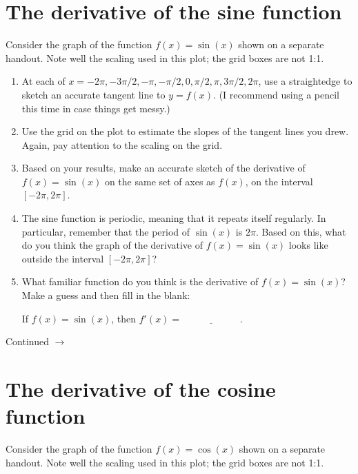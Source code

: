 \documentclass[11pt]{article}
\def\ra{\rightarrow}
\def\pageturn{\vfill 
\begin{flushright}
	\begin{small}
		Continued $\ra$
	\end{small}
\end{flushright} \newpage}
\begin{document}
\section{The derivative of the sine function}

Consider the graph of the function $f(x) = \sin(x)$ shown on a separate handout. Note well the scaling used in this plot; the grid boxes are not 1:1. 

\begin{enumerate}
	\item At each of $x = -2\pi, -3 \pi/2, -\pi, -\pi/2, 0, \pi/2, \pi, 3\pi/2, 2\pi$, use a straightedge to sketch an accurate tangent line to $y = f(x)$. (I recommend using a pencil this time in case things get messy.)
	\item Use the grid on the plot to estimate the slopes of the tangent lines you drew. Again, pay attention to the scaling on the grid. 
	\item Based on your results, make an accurate sketch of the derivative of $f(x) = \sin(x)$ on the same set of axes as $f(x)$, on the interval $[-2\pi, 2\pi]$. 
	\item The sine function is periodic, meaning that it repeats itself regularly. In particular, remember that the period of $\sin(x)$ is $2 \pi$. Based on this, what do you think the graph of the derivative of $f(x) = \sin(x)$ looks like outside the interval $[-2\pi, 2\pi]$? 

	\item What familiar function do you think is the derivative of $f(x) = \sin(x)$? Make a guess and then fill in the blank: 
	\begin{center}
		If $f(x) = \sin(x)$, then $f'(x) = \underline{\hspace{1in}}$. 
	\end{center}
\end{enumerate}

\pageturn

\section{The derivative of the cosine function}

Consider the graph of the function $f(x) = \cos(x)$ shown on a separate handout. Note well the scaling used in this plot; the grid boxes are not 1:1. 
\end{document}
